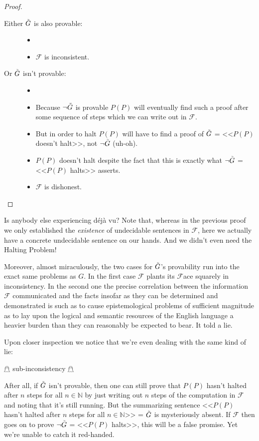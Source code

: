 \documentclass{article}
\newcommand{\F}{\ensuremath{\mathcal{F}}}
\newcommand{\iGoedel}{\ensuremath{\accentset{\scalebox{0.35}{$\infty$}}{G}}}
\begin{document}
\begin{proof}
\begin{description}
\begin{description}
\item[]
\item[Either $\iGoedel$ is also provable:]
\begin{itemize}
\item[]
\item $\F$ is inconsistent. \lightning
\end{itemize}
\item[Or $\iGoedel$ isn't provable:]
\begin{itemize}
\item[]
\item Because $\neg \iGoedel$ is provable $P(P)$ will eventually find such a proof after some sequence of steps which we can write out in $\F$.
\item But in order to halt $P(P)$ will have to find a proof of $\iGoedel$ = <<$P(P)$ doesn't halt>>, not $\neg \iGoedel$ (uh-oh).
\item $P(P)$ doesn't halt despite the fact that this is exactly what $\neg \iGoedel$ = <<$P(P)$ halts>> asserts.
\item $\F$ is dishonest. \lightning
\end{itemize}
\end{description}
\end{description}
\end{proof}

Is anybody else experiencing déjà vu? Note that, whereas in the previous proof we only established the \textit{existence} of undecidable sentences in $\F$, here we actually have a concrete undecidable sentence on our hands. And we didn't even need the Halting Problem!

Moreover, almost miraculously, the two cases for $\iGoedel$'s provability run into the exact same problems as $G$. In the first case $\F$ plants its $\F$ace squarely in inconsistency. In the second one the precise correlation between the information $\F$ communicated and the facts insofar as they can be determined and demonstrated is such as to cause epistemological problems of sufficient magnitude as to lay upon the logical and semantic resources of the English language a heavier burden than they can reasonably be expected to bear. It told a lie.\cite{yes-prime-minister}

Upon closer inspection we notice that we're even dealing with the same kind of lie:
\begin{center}
$\mathghost$ sub-inconsistency $\mathghost$
\end{center}
After all, if $\iGoedel$ isn't provable, then one can still prove that $P(P)$ hasn't halted after $n$ steps for all $n\in\mathbb{N}$ by just writing out $n$ steps of the computation in $\F$ and noting that it's still running. But the summarizing sentence <<$P(P)$ hasn't halted after $n$ steps for all $n\in\mathbb{N}$>> = $\iGoedel$ is mysteriously absent. If $\F$ then goes on to prove $\neg \iGoedel$ = <<$P(P)$ halts>>, this will be a false promise. Yet we're unable to catch it red-handed.
\end{document}
